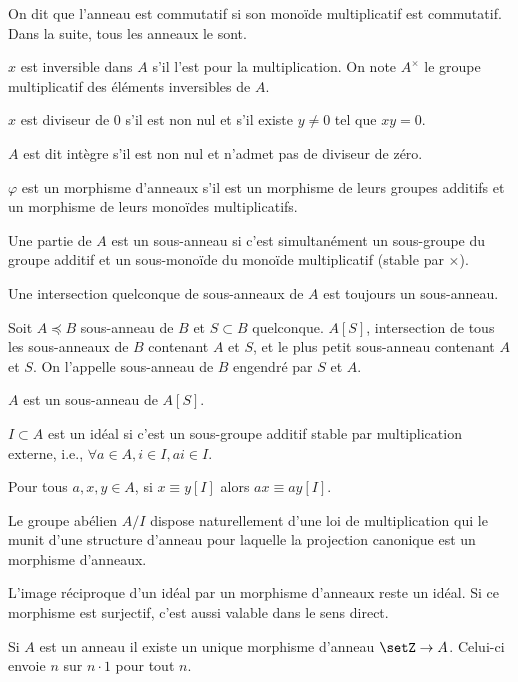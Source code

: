 \documentclass[a4paper,11pt,twocolumn]{article}
\begin{document}
    On dit que l'anneau est commutatif si son monoïde multiplicatif est commutatif. Dans la suite, tous les anneaux le sont.

     $x$ est inversible dans $A$ s'il l'est pour la multiplication. On note $A^\times$ le groupe multiplicatif des éléments inversibles de $A$.

     $x$ est diviseur de $0$ s'il est non nul et s'il existe $y\neq 0$ tel que $xy=0$.

     $A$ est dit intègre s'il est non nul et n'admet pas de diviseur de zéro.

     $\varphi$ est un morphisme d'anneaux s'il est un morphisme de leurs groupes additifs et un morphisme de leurs monoïdes multiplicatifs.

     Une partie de $A$ est un sous-anneau si c'est simultanément un sous-groupe du groupe additif et un sous-monoïde du monoïde multiplicatif (stable par $\times$).

     Une intersection quelconque de sous-anneaux de $A$ est toujours un sous-anneau.

     Soit $A\preccurlyeq B$ sous-anneau de $B$ et $S\subset B$ quelconque. $A[S]$, intersection de tous les sous-anneaux de $B$ contenant $A$ et $S$, et le plus petit sous-anneau contenant $A$ et $S$. On l'appelle sous-anneau de $B$ engendré par $S$ et $A$.

    $A$ est un sous-anneau de $A[S]$.

     $I\subset A$ est un idéal si c'est un sous-groupe additif stable par multiplication externe, i.e., $\forall a\in A, i\in I, ai\in I$.

     Pour tous $a,x,y\in A$, si $x\equiv y [I]$ alors $ax\equiv ay [I]$.

     Le groupe abélien $A/I$ dispose naturellement d'une loi de multiplication qui le munit d'une structure d'anneau pour laquelle la projection canonique est un morphisme d'anneaux.

     L'image réciproque d'un idéal par un morphisme d'anneaux reste un idéal. Si ce morphisme est surjectif, c'est aussi valable dans le sens direct.

     Si $A$ est un anneau il existe un unique morphisme d'anneau $\setZ\rightarrow A$. Celui-ci envoie $n$ sur $n\cdot 1$ pour tout $n$.
\end{document}
